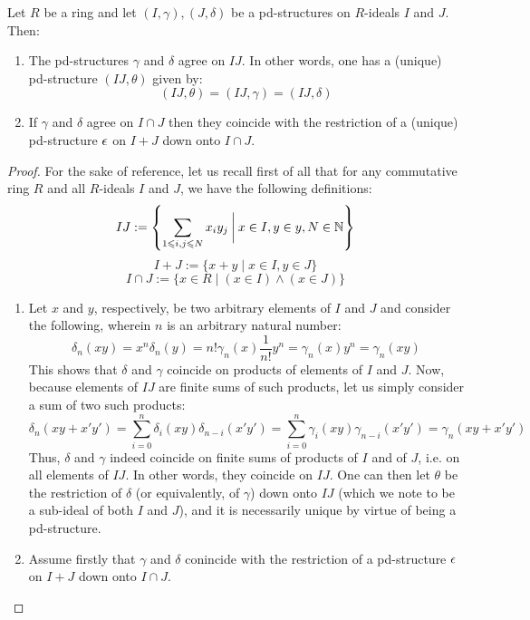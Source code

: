             \begin{proposition}
                Let $R$ be a ring and let $(I, \gamma), (J, \delta)$ be a pd-structures on $R$-ideals $I$ and $J$. Then:
                    \begin{enumerate}
                        \item The pd-structures $\gamma$ and $\delta$ agree on $IJ$. In other words, one has a (unique) pd-structure $(IJ, \theta)$ given by:
                            $$(IJ, \theta) = (IJ, \gamma) = (IJ, \delta)$$
                        \item If $\gamma$ and $\delta$ agree on $I \cap J$ then they coincide with the restriction of a (unique) pd-structure $\epsilon$ on $I + J$ down onto $I \cap J$.
                    \end{enumerate}
            \end{proposition}
                \begin{proof}
                    For the sake of reference, let us recall first of all that for any commutative ring $R$ and all $R$-ideals $I$ and $J$, we have the following definitions:
                        $$IJ := \left\{\sum_{1 \leqslant i, j \leqslant N} x_iy_j \: \bigg| \: x \in I, y \in y, N \in \mathbb{N} \right\}$$
                        $$I + J := \{x + y \mid x \in I, y \in J\}$$
                        $$I \cap J := \{x \in R \mid (x \in I) \wedge (x \in J)\}$$
                    \begin{enumerate}
                        \item Let $x$ and $y$, respectively, be two arbitrary elements of $I$ and $J$ and consider the following, wherein $n$ is an arbitrary natural number:
                            $$\delta_n(xy) = x^n\delta_n(y) = n!\gamma_n(x) \frac{1}{n!}y^n = \gamma_n(x)y^n = \gamma_n(xy)$$
                        This shows that $\delta$ and $\gamma$ coincide on products of elements of $I$ and $J$. Now, because elements of $IJ$ are finite sums of such products, let us simply consider a sum of two such products:
                            $$\delta_n(xy + x'y') = \sum_{i = 0}^n \delta_i(xy)\delta_{n - i}(x'y') = \sum_{i = 0}^n \gamma_i(xy)\gamma_{n - i}(x'y') = \gamma_n(xy + x'y')$$
                        Thus, $\delta$ and $\gamma$ indeed coincide on finite sums of products of $I$ and of $J$, i.e. on all elements of $IJ$. In other words, they coincide on $IJ$. One can then let $\theta$ be the restriction of $\delta$ (or equivalently, of $\gamma$) down onto $IJ$ (which we note to be a sub-ideal of both $I$ and $J$), and it is necessarily unique by virtue of being a pd-structure.
                        \item Assume firstly that $\gamma$ and $\delta$ conincide with the restriction of a pd-structure $\epsilon$ on $I + J$ down onto $I \cap J$. 
                    \end{enumerate}
                \end{proof}
                
